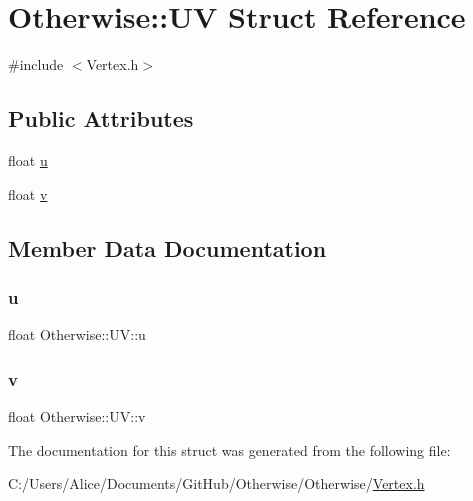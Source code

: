 \hypertarget{struct_otherwise_1_1_u_v}{}\section{Otherwise\+:\+:UV Struct Reference}
\label{struct_otherwise_1_1_u_v}


{\ttfamily \#include $<$Vertex.\+h$>$}

\subsection*{Public Attributes}
\begin{DoxyCompactItemize}
\item 
float \hyperlink{struct_otherwise_1_1_u_v_a975f196ac7decbae3ab10a27806c79b8}{u}
\item 
float \hyperlink{struct_otherwise_1_1_u_v_a76e248af8012e50e54028bd33afd485b}{v}
\end{DoxyCompactItemize}


\subsection{Member Data Documentation}
\mbox{\label{struct_otherwise_1_1_u_v_a975f196ac7decbae3ab10a27806c79b8}} 
\subsubsection{\texorpdfstring{u}{u}}
{\footnotesize\ttfamily float Otherwise\+::\+U\+V\+::u}

\mbox{\label{struct_otherwise_1_1_u_v_a76e248af8012e50e54028bd33afd485b}} 
\subsubsection{\texorpdfstring{v}{v}}
{\footnotesize\ttfamily float Otherwise\+::\+U\+V\+::v}



The documentation for this struct was generated from the following file\+:\begin{DoxyCompactItemize}
\item 
C\+:/\+Users/\+Alice/\+Documents/\+Git\+Hub/\+Otherwise/\+Otherwise/\hyperlink{_vertex_8h}{Vertex.\+h}\end{DoxyCompactItemize}
